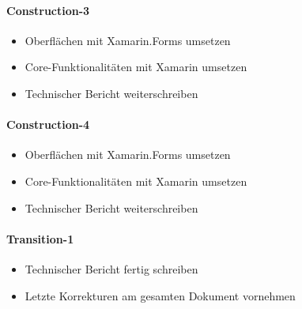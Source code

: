 \paragraph*{Construction-3}
\begin{itemize}
  \item Oberflächen mit Xamarin.Forms umsetzen
  \item Core-Funktionalitäten mit Xamarin umsetzen
  \item Technischer Bericht weiterschreiben
\end{itemize}

\paragraph*{Construction-4}
\begin{itemize}
  \item Oberflächen mit Xamarin.Forms umsetzen
  \item Core-Funktionalitäten mit Xamarin umsetzen
  \item Technischer Bericht weiterschreiben
\end{itemize}

\paragraph*{Transition-1}
\begin{itemize}
  \item Technischer Bericht fertig schreiben
  \item Letzte Korrekturen am gesamten Dokument vornehmen
\end{itemize}

